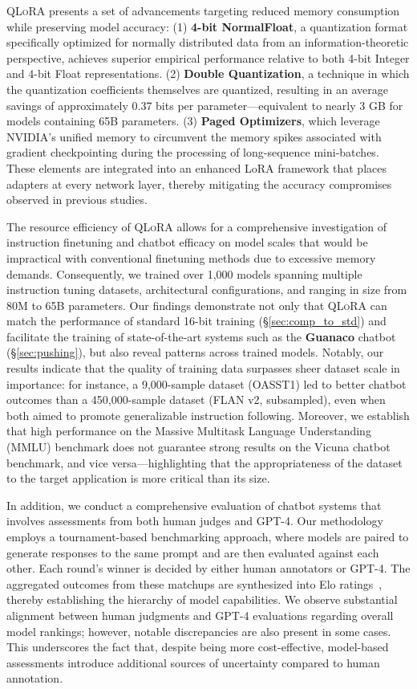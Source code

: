 \textsc{QLoRA} presents a set of advancements targeting reduced memory consumption while preserving model accuracy: (1) \textbf{4-bit NormalFloat}, a quantization format specifically optimized for normally distributed data from an information-theoretic perspective, achieves superior empirical performance relative to both 4-bit Integer and 4-bit Float representations. (2) \textbf{Double Quantization}, a technique in which the quantization coefficients themselves are quantized, resulting in an average savings of approximately 0.37 bits per parameter—equivalent to nearly 3 GB for models containing 65B parameters. (3) \textbf{Paged Optimizers}, which leverage NVIDIA's unified memory to circumvent the memory spikes associated with gradient checkpointing during the processing of long-sequence mini-batches. These elements are integrated into an enhanced LoRA framework that places adapters at every network layer, thereby mitigating the accuracy compromises observed in previous studies.

The resource efficiency of \textsc{QLoRA} allows for a comprehensive investigation of instruction finetuning and chatbot efficacy on model scales that would be impractical with conventional finetuning methods due to excessive memory demands. Consequently, we trained over 1,000 models spanning multiple instruction tuning datasets, architectural configurations, and ranging in size from 80M to 65B parameters. Our findings demonstrate not only that \textsc{QLoRA} can match the performance of standard 16-bit training (\S\ref{sec:comp_to_std}) and facilitate the training of state-of-the-art systems such as the \textbf{Guanaco} chatbot (\S\ref{sec:pushing}), but also reveal patterns across trained models. Notably, our results indicate that the quality of training data surpasses sheer dataset scale in importance: for instance, a 9,000-sample dataset (OASST1) led to better chatbot outcomes than a 450,000-sample dataset (FLAN v2, subsampled), even when both aimed to promote generalizable instruction following. Moreover, we establish that high performance on the Massive Multitask Language Understanding (MMLU) benchmark does not guarantee strong results on the Vicuna chatbot benchmark, and vice versa—highlighting that the appropriateness of the dataset to the target application is more critical than its size.

In addition, we conduct a comprehensive evaluation of chatbot systems that involves assessments from both human judges and GPT-4. Our methodology employs a tournament-based benchmarking approach, where models are paired to generate responses to the same prompt and are then evaluated against each other. Each round’s winner is decided by either human annotators or GPT-4. The aggregated outcomes from these matchups are synthesized into Elo ratings~\citep{elo1967proposed, elo1978rating}, thereby establishing the hierarchy of model capabilities. We observe substantial alignment between human judgments and GPT-4 evaluations regarding overall model rankings; however, notable discrepancies are also present in some cases. This underscores the fact that, despite being more cost-effective, model-based assessments introduce additional sources of uncertainty compared to human annotation.

